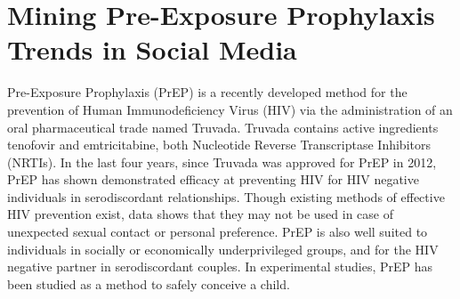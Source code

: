 


%



\section{Mining Pre-Exposure Prophylaxis Trends in Social Media}

Pre-Exposure Prophylaxis (PrEP) is a recently developed method for the prevention of Human Immunodeficiency Virus (HIV) via the administration of an oral pharmaceutical trade named Truvada. Truvada contains active ingredients tenofovir and emtricitabine, both Nucleotide Reverse Transcriptase Inhibitors (NRTIs). In the last four years, since Truvada was approved for PrEP in 2012, PrEP has shown demonstrated efficacy at preventing HIV for HIV negative individuals in serodiscordant relationships\cite{liu2014early}. Though existing methods of effective HIV prevention exist, data shows that they may not be used in case of unexpected sexual contact or personal preference\cite{taylor2016life}. PrEP is also well suited to individuals in socially or economically underprivileged groups, and for the HIV negative partner in serodiscordant couples\cite{ware2012s}. In experimental studies, PrEP has been studied as a method to safely conceive a child\cite{lampe2011achieving}.

